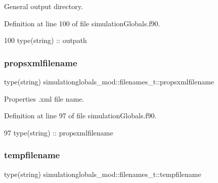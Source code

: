 General output directory. 



Definition at line 100 of file simulation\+Globals.\+f90.


\begin{DoxyCode}
100         \textcolor{keywordtype}{type}(string) :: outpath
\end{DoxyCode}
\mbox{\label{structsimulationglobals__mod_1_1filenames__t_aa68e6aa970dcc2fb6ef62f5c20373948}} 
\subsubsection{\texorpdfstring{propsxmlfilename}{propsxmlfilename}}
{\footnotesize\ttfamily type(string) simulationglobals\+\_\+mod\+::filenames\+\_\+t\+::propsxmlfilename\hspace{0.3cm}{\ttfamily [private]}}



Properties .xml file name. 



Definition at line 97 of file simulation\+Globals.\+f90.


\begin{DoxyCode}
97         \textcolor{keywordtype}{type}(string) :: propsxmlfilename
\end{DoxyCode}
\mbox{\label{structsimulationglobals__mod_1_1filenames__t_a65117f3cf40366162812c184decc8298}} 
\subsubsection{\texorpdfstring{tempfilename}{tempfilename}}
{\footnotesize\ttfamily type(string) simulationglobals\+\_\+mod\+::filenames\+\_\+t\+::tempfilename\hspace{0.3cm}{\ttfamily [private]}}



